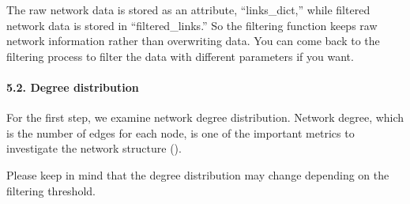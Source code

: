 \documentclass[letterpaper,10pt,english]{sphinxmanual}
\begin{document}
The raw network data is stored as an attribute, “links\_dict,” while filtered network data is stored in “filtered\_links.” So the filtering function keeps raw network information rather than overwriting data. You can come back to the filtering process to filter the data with different parameters if you want.

{
%
\begin{sphinxVerbatim}[commandchars=\\\{\}]
\llap{\color{nbsphinxin}[32]:\,\hspace{\fboxrule}\hspace{\fboxsep}}  
\end{sphinxVerbatim}
}


\paragraph{5.2. Degree distribution}
\label{\detokenize{notebooks/04_Network_analysis/Network_analysis_with_with_Paul_etal_2015_data:5.2.-Degree-distribution}}
For the first step, we examine network degree distribution. Network degree, which is the number of edges for each node, is one of the important metrics to investigate the network structure ().

Please keep in mind that the degree distribution may change depending on the filtering threshold.

{
%
\begin{sphinxVerbatim}[commandchars=\\\{\}]
\llap{\color{nbsphinxin}[50]:\,\hspace{\fboxrule}\hspace{\fboxsep}}\PYG{p}{[}\PYG{p}{]}  \PYG{p}{[} \PYG{p}{]}
\end{sphinxVerbatim}
}
\end{document}

